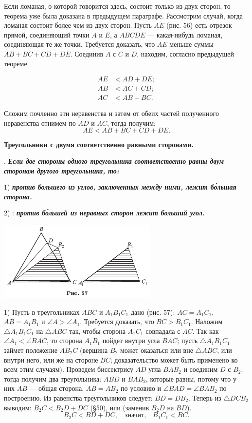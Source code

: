 \documentclass[oneside]{book}
\begin{document}
Если ломаная, о которой говорится здесь, состоит только из двух сторон, то теорема уже была доказана в предыдущем параграфе.
Рассмотрим случай, когда ломаная состоит более чем из двух сторон.
Пусть $AE$ (рис. 56) есть отрезок прямой, соединяющий точки $A$ и $E$, а $ABCDE$ — какая-нибудь ломаная, соединяющая те же точки.
Требуется доказать, что $AE$ меньше суммы $AB+BC+CD+DE$.
Соединив $A$ с $C$ и $D$, находим, согласно предыдущей теореме.

\begin{align*}
AE&<AD+DE;
\\
AB&<AC +CD;
\\
AC&<AB+BC.
\end{align*}

Сложим почленно эти неравенства и затем от обеих частей полученного неравенства отнимем по $AD$ и $AC$, тогда получим:
\[AE<AB+BC +CD + DE.\]

\textbf{Треугольники с двумя соответственно равными сторонами.}

.
\textbf{\emph{Если две стороны одного треугольника соответственно равны двум сторонам другого треугольника, то:}}

1) \textbf{\emph{против большего из углов, заключенных между ними, лежит б\'{о}льшая сторона.}}

2) :
\textbf{\emph{против б\'{о}льшей из неравных сторон лежит больший угол.}}

\includegraphics{pics/ris-57}

1) Пусть в треугольниках $ABC$ и $A_1B_1C_1$ дано (рис. 57):
$AC=A_1C_1$, $AB=A_1B_1$ и $\angle A > \angle A_1$.
Требуется доказать, что $BC>B_1C_1$.
Наложим $\triangle A_1B_1C_1$ на $\triangle ABC$ так, чтобы сторона $A_1C_1$ совпадала с $AC$.
Так как $\angle A_1 < \angle BAC$, то сторона $A_1B_1$ пойдет внутри угла $BAC$;
пусть $\triangle A_1B_1C_1$ займет положение $AB_2C$ (вершина $B_2$ может оказаться или вне $\triangle ABC$, или внутри него, или же на стороне $BC$;
доказательство может быть применено ко всем этим случаям).
Проведем биссектрису $AD$ угла $BAB_2$ и соединим $D$ с $B_2$;
тогда получим два треугольника:
$ABD$ и $BAB_2$, которые равны, потому что у них $AB$ — общая сторона, $AB=AB_2$ по условию и $\angle BAD=\angle BAB_2$ по построению.
Из равенства треугольников следует:
$BD=DB_2$.
Теперь из $\triangle DCB_2$ выводим:
$B_2C < B_2D + DC$ (§50), или (заменив $B_2D$ на $BD$).
\[B_2C <BD +DC,\quad\text{значит,}\quad B_1C_1 < BC.\]
\end{document}
